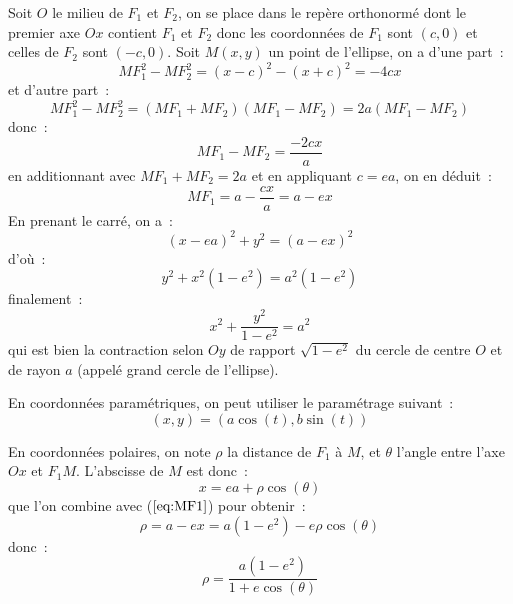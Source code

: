 \documentclass[a4paper,11pt]{book}
\begin{document}
\begin{giacjshere}
Soit $O$ le milieu de $F_1$ et $F_2$, on se place dans le rep\`ere 
orthonorm\'e
dont le premier axe $Ox$ contient $F_1$ et $F_2$ donc les
coordonn\'ees de $F_1$ sont $(c,0)$ et celles de $F_2$ sont $(-c,0)$. 
Soit $M(x,y)$ un
point de l'ellipse, on a d'une part~:
\[ MF_1^2 - MF_2^2 = (x-c)^2-(x+c)^2 = -4cx \]
et d'autre part~:
\[ MF_1^2 - MF_2^2 = (MF_1 + MF_2)(MF_1 - MF_2 ) = 2a (MF_1 - MF_2 )\]
donc~:
\[ MF_1 - MF_2 = \frac{-2cx}{a} \]
en additionnant avec $MF_1+MF_2=2a$ et en appliquant $c=ea$, on en d\'eduit~:
\begin{equation} \label{eq:MF1}
 MF_1 = a - \frac{cx}{a} = a-ex 
\end{equation}
En prenant le carr\'e, on a~:
\[ (x-ea)^2 + y^2 = (a-ex)^2\]
d'o\`u~:
\[ y^2 + x^2 (1-e^2) = a^2(1-e^2) \]
finalement~:
\[ x^2 + \frac{y^2}{1-e^2} = a^2 \]
qui est bien la contraction selon $Oy$ de rapport $\sqrt{1-e^2}$ du
cercle de centre $O$ et de rayon $a$ (appel\'e grand cercle de
l'ellipse).

En coordonn\'ees param\'etriques, on peut utiliser le param\'etrage suivant~:
$$ (x,y)=(a\cos(t),b\sin(t))$$

En coordonn\'ees polaires, on note $\rho$ la distance de $F_1$ \`a
$M$, et $\theta$ l'angle entre l'axe $Ox$ et $F_1M$. L'abscisse de $M$
est donc~:
\[ x= ea + \rho \cos(\theta)\]
que l'on combine avec (\(\ref{eq:MF1}\)) pour obtenir~:
\[ \rho = a-ex =a(1-e^2) - e \rho \cos(\theta) \]
donc~:
\[ \rho = \frac{a(1-e^2)}{1+e\cos(\theta)} \]


\end{giacjshere}
\end{document}
